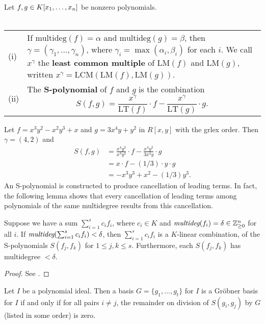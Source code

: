 \documentclass[english,bachelor]{liumaiex}
\begin{document}
\begin{define}
Let $f,g\in K[x_1,\dots, x_n]$ be nonzero polynomials.\\ \\
\begin{tabular}{l p{10cm}}
(i) & If $\textrm{multideg}(f)=\alpha$ and $\textrm{multideg}(g)=\beta$, then $\gamma=(\gamma_1,\dots,\gamma_n)$, where $\gamma_i=\max(\alpha_i,\beta_i)$ for each $i$. We call $x^\gamma$ the \textbf{least common multiple}\index{Least common multiple}\index{lcd|see {Least common multiple}} of $\textrm{LM}(f)$ and $\textrm{LM}(g)$, written $x^\gamma=\textrm{LCM}(\textrm{LM}(f),\textrm{LM}(g))$.\\
(ii) & The \textbf{S-polynomial} of $f$ and $g$ is the combination
\begin{displaymath}
S(f,g)=\frac{x^\gamma}{\textrm{LT}(f)}\cdot f - \frac{x^\gamma}{\textrm{LT}(g)}\cdot g.
\end{displaymath}
\end{tabular}
\end{define}
Let $f=x^3y^2-x^2y^3+x$ and $g=3x^4y+y^2$ in $R[x,y]$ with the grlex order. Then $\gamma=(4,2)$ and
\begin{align*}
S(f,g)&=\frac{x^4y^2}{x^3y^2}\cdot f-\frac{x^4y^2}{3x^4y}\cdot g \\&= x\cdot f-(1/3)\cdot y\cdot g\\&=-x^3y^3+x^2-(1/3)y^3.
\end{align*}
An S-polynomial is constructed to produce cancellation of leading terms. In fact, the following lemma shows that every cancellation of leading terms among polynomials of the same multidegree results from this cancellation.

\begin{lem}
Suppose we have a sum $\sum_{i=1}^{s}c_if_i$, where $c_i\in K$ and $\emph{multideg}(f_i)=\delta\in\mathbb{Z}_{\geq 0}^n$ for all $i$. If $\emph{multideg}(\sum_{i=1}^{s}c_if_i)<\delta$, then $\sum_{i=1}^{s}c_if_i$ is a $K$-linear combination, of the S-polynomials $S(f_j,f_k)$ for $1\leq j,k\leq s$. Furthermore, each $S(f_j,f_k)$ has multidegree $<\delta$.
\end{lem}

\begin{proof}
See \cite[p. 84]{cox}.
\end{proof}

\begin{thm}\label{thm:buchberger}
Let $I$ be a polynomial ideal. Then a basis $G=\{g_1,\dots,g_t\}$ for $I$ is a Gröbner basis for $I$ if and only if for all pairs $i\neq j$, the remainder on division of $S(g_i,g_j)$ by $G$ (listed in some order) is zero.
\end{thm}
\end{document}
